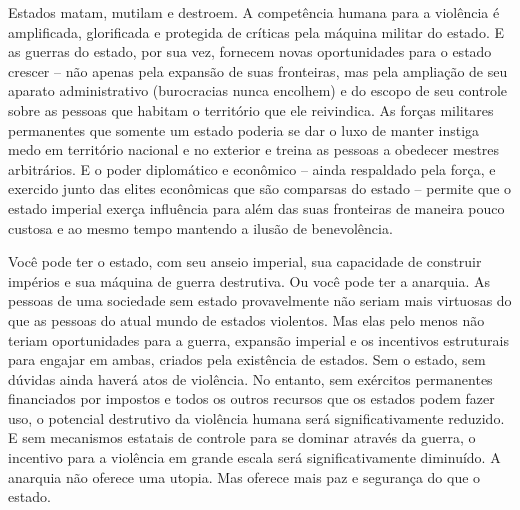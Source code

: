 Estados matam, mutilam e destroem. A competência humana para a violência é amplificada, glorificada e protegida de críticas pela máquina militar do estado. E as guerras do estado, por sua vez, fornecem novas oportunidades para o estado crescer -- não apenas pela expansão de suas fronteiras, mas pela ampliação de seu aparato administrativo (burocracias nunca encolhem) e do escopo de seu controle sobre as pessoas que habitam o território que ele reivindica. As forças militares permanentes que somente um estado poderia se dar o luxo de manter instiga medo em território nacional e no exterior e treina as pessoas a obedecer mestres arbitrários. E o poder diplomático e econômico -- ainda respaldado pela força, e exercido junto das elites econômicas que são comparsas do estado -- permite que o estado imperial exerça influência para além das suas fronteiras de maneira pouco custosa e ao mesmo tempo mantendo a ilusão de benevolência.

Você pode ter o estado, com seu anseio imperial, sua capacidade de construir impérios e sua máquina de guerra destrutiva. Ou você pode ter a anarquia. As pessoas de uma sociedade sem estado provavelmente não seriam mais virtuosas do que as pessoas do atual mundo de estados violentos. Mas elas pelo menos não teriam oportunidades para a guerra, expansão imperial e os incentivos estruturais para engajar em ambas, criados pela existência de estados. Sem o estado, sem dúvidas ainda haverá atos de violência. No entanto, sem exércitos permanentes financiados por impostos e todos os outros recursos que os estados podem fazer uso, o potencial destrutivo da violência humana será significativamente reduzido. E sem mecanismos estatais de controle para se dominar através da guerra, o incentivo para a violência em grande escala será significativamente diminuído. A anarquia não oferece uma utopia. Mas oferece mais paz e segurança do que o estado.